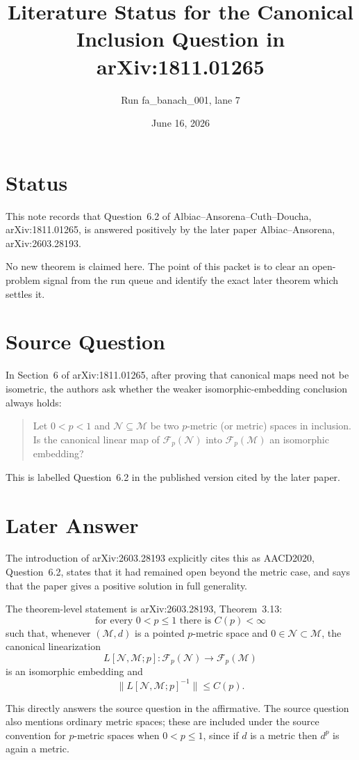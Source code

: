 \documentclass[11pt]{article}
\title{Literature Status for the Canonical Inclusion Question in arXiv:1811.01265}
\author{Run fa\_banach\_001, lane 7}
\date{June 16, 2026}
\newcommand{\Fp}{\mathcal F_p}
\newcommand{\M}{\mathcal M}
\newcommand{\N}{\mathcal N}
\begin{document}
\maketitle

\section*{Status}

This note records that Question~6.2 of
Albiac--Ansorena--Cuth--Doucha, arXiv:1811.01265, is answered positively by the
later paper Albiac--Ansorena, arXiv:2603.28193.

No new theorem is claimed here. The point of this packet is to clear an
open-problem signal from the run queue and identify the exact later theorem
which settles it.

\section*{Source Question}

In Section~6 of arXiv:1811.01265, after proving that canonical maps need not be
isometric, the authors ask whether the weaker isomorphic-embedding conclusion
always holds:
\begin{quote}
Let $0<p<1$ and $\N\subseteq \M$ be two $p$-metric (or metric) spaces in
inclusion. Is the canonical linear map of $\Fp(\N)$ into $\Fp(\M)$ an
isomorphic embedding?
\end{quote}
This is labelled Question~6.2 in the published version cited by the later
paper.

\section*{Later Answer}

The introduction of arXiv:2603.28193 explicitly cites this as AACD2020,
Question~6.2, states that it had remained open beyond the metric case, and says
that the paper gives a positive solution in full generality.

The theorem-level statement is arXiv:2603.28193, Theorem~3.13:
\[
  \text{for every }0<p\leq 1\text{ there is }C(p)<\infty
\]
such that, whenever $(\M,d)$ is a pointed $p$-metric space and
$0\in\N\subset \M$, the canonical linearization
\[
  L[\N,\M;p]\colon \Fp(\N)\longrightarrow \Fp(\M)
\]
is an isomorphic embedding and
\[
  \|L[\N,\M;p]^{-1}\|\leq C(p).
\]

This directly answers the source question in the affirmative. The source
question also mentions ordinary metric spaces; these are included under the
source convention for $p$-metric spaces when $0<p\leq 1$, since if $d$ is a
metric then $d^p$ is again a metric.
\end{document}
